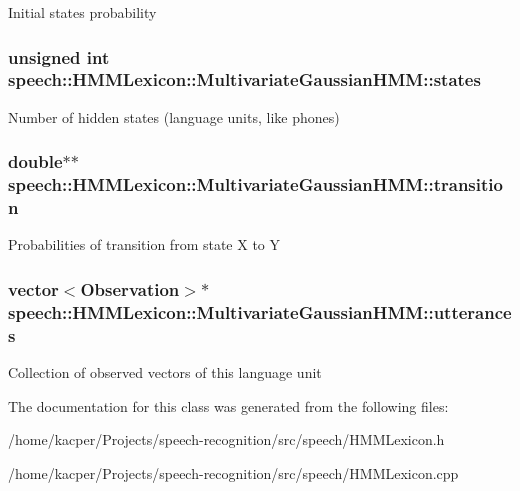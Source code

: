 Initial states probability \hypertarget{classspeech_1_1HMMLexicon_1_1MultivariateGaussianHMM_a229cdec64f3eb25b3dc21aa32995ecd8}{
\subsubsection[{states}]{\setlength{\rightskip}{0pt plus 5cm}unsigned int speech\+::\+H\+M\+M\+Lexicon\+::\+Multivariate\+Gaussian\+H\+M\+M\+::states\hspace{0.3cm}{\ttfamily [protected]}}}\label{classspeech_1_1HMMLexicon_1_1MultivariateGaussianHMM_a229cdec64f3eb25b3dc21aa32995ecd8}
Number of hidden states (language units, like phones) \hypertarget{classspeech_1_1HMMLexicon_1_1MultivariateGaussianHMM_ac5608b1ed95966bfd53854a7bcfe79f7}{
\subsubsection[{transition}]{\setlength{\rightskip}{0pt plus 5cm}double$\ast$$\ast$ speech\+::\+H\+M\+M\+Lexicon\+::\+Multivariate\+Gaussian\+H\+M\+M\+::transition\hspace{0.3cm}{\ttfamily [protected]}}}\label{classspeech_1_1HMMLexicon_1_1MultivariateGaussianHMM_ac5608b1ed95966bfd53854a7bcfe79f7}
Probabilities of transition from state X to Y \hypertarget{classspeech_1_1HMMLexicon_1_1MultivariateGaussianHMM_a8344a96832f52f9691933109e253308e}{
\subsubsection[{utterances}]{\setlength{\rightskip}{0pt plus 5cm}vector$<$Observation$>$$\ast$ speech\+::\+H\+M\+M\+Lexicon\+::\+Multivariate\+Gaussian\+H\+M\+M\+::utterances\hspace{0.3cm}{\ttfamily [protected]}}}\label{classspeech_1_1HMMLexicon_1_1MultivariateGaussianHMM_a8344a96832f52f9691933109e253308e}
Collection of observed vectors of this language unit 

The documentation for this class was generated from the following files\+:\begin{DoxyCompactItemize}
\item 
/home/kacper/\+Projects/speech-\/recognition/src/speech/H\+M\+M\+Lexicon.\+h\item 
/home/kacper/\+Projects/speech-\/recognition/src/speech/H\+M\+M\+Lexicon.\+cpp\end{DoxyCompactItemize}
